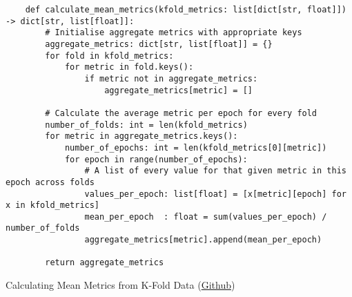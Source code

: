 \begin{listing}[H]
    \begin{verbatim}
    def calculate_mean_metrics(kfold_metrics: list[dict[str, float]]) -> dict[str, list[float]]:
        # Initialise aggregate metrics with appropriate keys
        aggregate_metrics: dict[str, list[float]] = {}
        for fold in kfold_metrics:
            for metric in fold.keys():
                if metric not in aggregate_metrics:
                    aggregate_metrics[metric] = []

        # Calculate the average metric per epoch for every fold
        number_of_folds: int = len(kfold_metrics)
        for metric in aggregate_metrics.keys():
            number_of_epochs: int = len(kfold_metrics[0][metric])
            for epoch in range(number_of_epochs):
                # A list of every value for that given metric in this epoch across folds
                values_per_epoch: list[float] = [x[metric][epoch] for x in kfold_metrics]
                mean_per_epoch  : float = sum(values_per_epoch) / number_of_folds
                aggregate_metrics[metric].append(mean_per_epoch)

        return aggregate_metrics
    \end{verbatim}
\caption{Calculating Mean Metrics from K-Fold Data (\href{https://github.com/ShenZhouHong/radiography-ai-project/blob/52b2674f328c7595a32b7e4bcd2c6d4d4824e4ca/python/common/utilities.py}{Github})}\label{listing:calc-mean-metrics}
\end{listing}